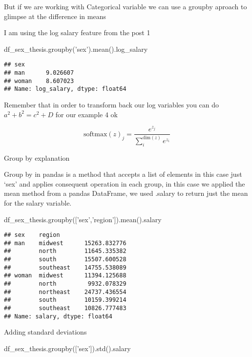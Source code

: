 \documentclass[]{article}
\newenvironment{Shaded}{\begin{snugshade}}{\end{snugshade}}
\newcommand{\NormalTok}[1]{#1}
\newcommand{\StringTok}[1]{\textcolor[rgb]{0.31,0.60,0.02}{#1}}
\begin{document}
But if we are working with Categorical variable we can use a groupby
aproach to glimpse at the difference in means

I am using the log salary feature from the post 1

\begin{Shaded}
\begin{Highlighting}[]
\NormalTok{df_sex_thesis.groupby(}\StringTok{'sex'}\NormalTok{).mean().log_salary}
\end{Highlighting}
\end{Shaded}

\begin{verbatim}
## sex
## man      9.026607
## woman    8.607023
## Name: log_salary, dtype: float64
\end{verbatim}

Remember that in order to transform back our log variables you can do
\(a^2 + b^2 = c^2 + D\) for our example 4 ok

\[\text{softmax}(z)_j = \frac{e^{z_j}}{\sum_i^{\text{dim}(z)}e^{z_i}}\]

Group by explanation

Group by in pandas is a method that accepts a list of elements in this
case just `sex' and applies consequent operation in each group, in this
case we applied the mean method from a pandas DataFrame, we used .salary
to return just the mean for the salary variable.

\begin{Shaded}
\begin{Highlighting}[]
\NormalTok{df_sex_thesis.groupby([}\StringTok{'sex'}\NormalTok{,}\StringTok{'region'}\NormalTok{]).mean().salary}
\end{Highlighting}
\end{Shaded}

\begin{verbatim}
## sex    region   
## man    midwest      15263.832776
##        north        11645.335382
##        south        15507.600528
##        southeast    14755.538089
## woman  midwest      11394.125688
##        north         9932.078329
##        northeast    24737.436554
##        south        10159.399214
##        southeast    10826.777483
## Name: salary, dtype: float64
\end{verbatim}

Adding standard deviations

\begin{Shaded}
\begin{Highlighting}[]
\NormalTok{df_sex_thesis.groupby([}\StringTok{'sex'}\NormalTok{]).std().salary}
\end{Highlighting}
\end{Shaded}
\end{document}
